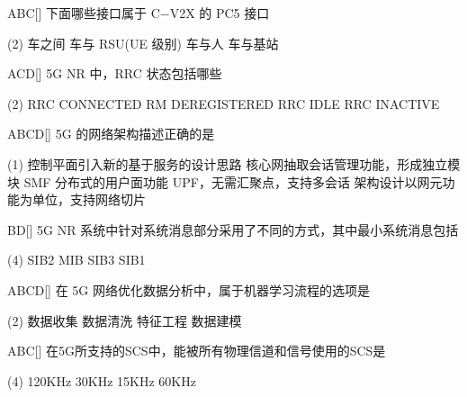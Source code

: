 \begin{choice}{\;ABC\;}[]
    下面哪些接口属于 C−V2X 的 PC5 接口
    \begin{tasks}(2)
        \task 车之间
        \task 车与 RSU(UE 级别)
        \task 车与人
        \task 车与基站
    \end{tasks}
\end{choice}


\begin{choice}{\;ACD\;}[]
    5G NR 中，RRC 状态包括哪些
    \begin{tasks}(2)
        \task RRC CONNECTED
        \task  RM DEREGISTERED
        \task RRC IDLE
        \task RRC INACTIVE
    \end{tasks}
\end{choice}

\begin{choice}{\;ABCD\;}[]
    5G 的网络架构描述正确的是
    \begin{tasks}(1)
        \task 控制平面引入新的基于服务的设计思路
        \task 核心网抽取会话管理功能，形成独立模块 SMF
        \task 分布式的用户面功能 UPF，无需汇聚点，支持多会话
        \task 架构设计以网元功能为单位，支持网络切片
    \end{tasks}
\end{choice}

\begin{choice}{\;BD\;}[]
    5G NR 系统中针对系统消息部分采用了不同的方式，其中最小系统消息包括
    \begin{tasks}(4)
        \task SIB2
        \task MIB
        \task SIB3
        \task SIB1
    \end{tasks}
\end{choice}


\begin{choice}{\;ABCD\;}[]
    在 5G 网络优化数据分析中，属于机器学习流程的选项是
    \begin{tasks}(2)
        \task 数据收集
        \task 数据清洗
        \task 特征工程
        \task 数据建模
    \end{tasks}
\end{choice}


\begin{choice}{\;ABC\;}[]
    在5G所支持的SCS中，能被所有物理信道和信号使用的SCS是
    \begin{tasks}(4)
        \task 120KHz
        \task 30KHz
        \task 15KHz
        \task 60KHz
    \end{tasks}
\end{choice}



